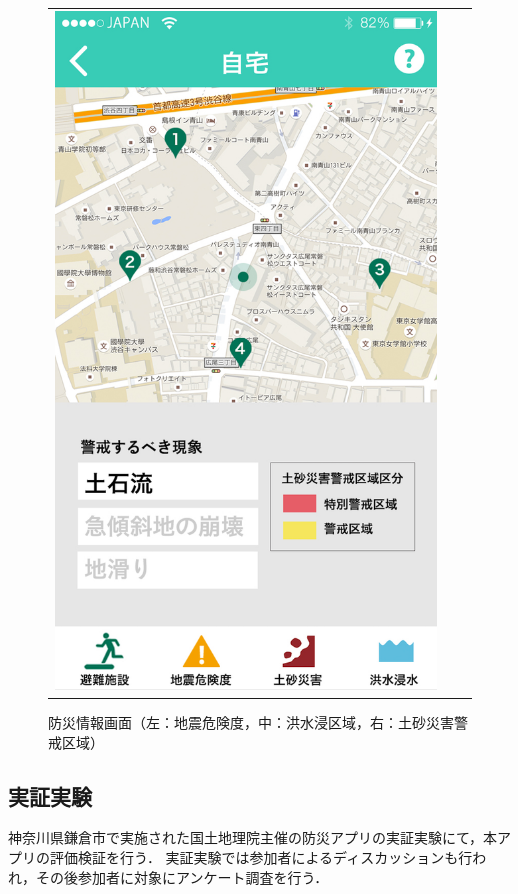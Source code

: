 \documentclass[a4paper]{jsarticle}
\begin{document}
\begin{figure}[H]
\begin{center}
\begin{tabular}{ccc}
\begin{minipage}{0.3\hsize}
      \includegraphics[width=\hsize]{./images/mbs_sediment.jpg}
    \end{minipage}

  \end{tabular}
    \caption{防災情報画面（左：地震危険度，中：洪水浸区域，右：土砂災害警戒区域）}
    \label{fig:screen-structure-02}
  \end{center}
\end{figure}
\fi


\subsection{実証実験}
神奈川県鎌倉市で実施された国土地理院主催の防災アプリの実証実験にて，本アプリの評価検証を行う．
実証実験では参加者によるディスカッションも行われ，その後参加者に対象にアンケート調査を行う．
\end{document}
